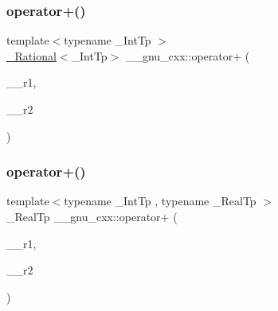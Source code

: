 \subsubsection{\texorpdfstring{operator+()}{operator+()}\hspace{0.1cm}{\footnotesize\ttfamily [2/4]}}
{\footnotesize\ttfamily template$<$typename \+\_\+\+Int\+Tp $>$ \\
\hyperlink{class____gnu__cxx_1_1__Rational}{\+\_\+\+Rational}$<$\+\_\+\+Int\+Tp$>$ \+\_\+\+\_\+gnu\+\_\+cxx\+::operator+ (\begin{DoxyParamCaption}\item[{const \hyperlink{class____gnu__cxx_1_1__Rational}{\+\_\+\+Rational}$<$ \+\_\+\+Int\+Tp $>$ \&}]{\+\_\+\+\_\+r1,  }\item[{const \hyperlink{class____gnu__cxx_1_1__Rational}{\+\_\+\+Rational}$<$ \+\_\+\+Int\+Tp $>$ \&}]{\+\_\+\+\_\+r2 }\end{DoxyParamCaption})}

\mbox{\label{namespace____gnu__cxx_a2e92d3f8483689a453a81317d31bc73e}} 
\subsubsection{\texorpdfstring{operator+()}{operator+()}\hspace{0.1cm}{\footnotesize\ttfamily [3/4]}}
{\footnotesize\ttfamily template$<$typename \+\_\+\+Int\+Tp , typename \+\_\+\+Real\+Tp $>$ \\
\+\_\+\+Real\+Tp \+\_\+\+\_\+gnu\+\_\+cxx\+::operator+ (\begin{DoxyParamCaption}\item[{\+\_\+\+Real\+Tp}]{\+\_\+\+\_\+r1,  }\item[{const \hyperlink{class____gnu__cxx_1_1__Rational}{\+\_\+\+Rational}$<$ \+\_\+\+Int\+Tp $>$ \&}]{\+\_\+\+\_\+r2 }\end{DoxyParamCaption})}

\mbox{\label{namespace____gnu__cxx_a5128562c48e4ec118f5b6947159bf3eb}} 
